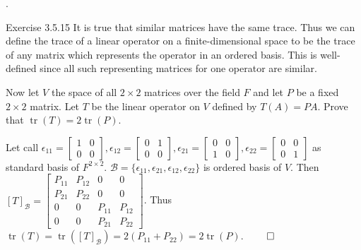 \documentclass[8pt]{beamer}
\newcommand{\mc}[1]{\mathcal{#1}}
\newcommand{\tr}{\operatorname{tr}}
\begin{document}
\begin{frame}{.}
    \begin{block}{Exercise 3.5.15}
        It is true that similar matrices have the same trace.
        Thus we can define the trace of a linear operator on a finite-dimensional space to be the trace of any matrix which represents the operator in an ordered basis.
        This is well-defined since all such representing matrices for one operator are similar.

        Now let $V$ the space of all $2\times 2$ matrices over the field $F$ and let $P$ be a fixed $2 \times 2$ matrix.
        Let $T$ be the linear operator on $V$ defined by $T(A) =PA$.
        Prove that $\tr(T) = 2 \tr(P)$.

        \smallskip
        Let call $\epsilon_{11} = \begin{bmatrix}
        1 & 0 \\ 0 & 0
        \end{bmatrix}, \epsilon_{12} = \begin{bmatrix}
        0 & 1 \\ 0 & 0
        \end{bmatrix}, \epsilon_{21} = \begin{bmatrix}
        0 & 0 \\ 1 & 0
        \end{bmatrix}, \epsilon_{22} = \begin{bmatrix}
        0 & 0 \\ 0 & 1
        \end{bmatrix}$ as standard basis of $F^{2 \times 2}$.
        $\mc{B} = \{\epsilon_{11}, \epsilon_{21}, \epsilon_{12}, \epsilon_{22}\}$ is ordered basis of $V$.
        Then $[T]_{\mc{B}} = \begin{bmatrix}
        P_{11} & P_{12} & 0 & 0 \\P_{21} & P_{22} & 0 & 0 \\ 0 & 0 & P_{11} & P_{12} \\ 0 & 0 & P_{21} & P_{22}
        \end{bmatrix}$.
        Thus $\tr (T) = \tr ([T]_{\mc{B}}) = 2(P_{11} + P_{22}) = 2\tr(P)$.
        $\qed$
    \end{block}
\end{frame}
\end{document}
